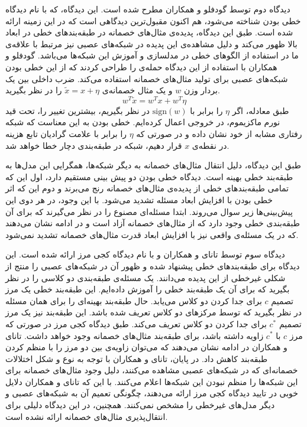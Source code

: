 \documentclass[12pt,onecolumn,a4paper]{article}
\begin{document}
دیدگاه دوم توسط گودفلو و همکاران\cite{goodfellow2014explaining}
مطرح شده است. این دیدگاه، که با نام دیدگاه خطی بودن شناخته می‌شود، هم اکنون مقبول‌ترین دیدگاهی است که در این زمینه ارائه شده است. طبق این دیدگاه، پدیده‌ی مثال‌های خصمانه در طبقه‌بندهای خطی در ابعاد بالا ظهور می‌کند و دلیل مشاهده‌ی این پدیده در شبکه‌های عصبی نیز مرتبط با علاقه‌ی ما در استفاده از الگوهای خطی در مدلسازی و آموزش این شبکه‌ها می‌باشد. گودفلو و همکاران با استفاده از این دیدگاه حمله‌ی
را طراحی کردند که از این خطی بودن شبکه‌های عصبی برای تولید مثال‌های خصمانه استفاده می‌کند. ضرب داخلی بین یک بردار وزن $w$ و یک مثال خصمانه‌ی $\tilde{x}=x+\eta$ را در نظر بگیرید.
\begin{equation*}
w^T\tilde{x}=w^Tx+w^T\eta
\end{equation*}
طبق معادله، اگر $\eta$ را برابر با $\mathrm{sign}(w)$ در نظر بگیریم، بیشترین تغییر را، تحت قید نورم ماکزیموم، در خروجی اعمال کرده‌ایم. خطی بودن به این معناست که شبکه رفتاری مشابه از خود نشان داده و در صورتی که $\eta$ را برابر با علامت گرادیان تابع هزینه در نقطه‌ی $x$ قرار دهیم، شبکه در طبقه‌بندی دچار خطا خواهد شد.

طبق این دیدگاه، دلیل انتقال مثال‌های خصمانه به دیگر شبکه‌ها، همگرایی این مدل‌ها به طبقه‌بند خطی بهینه است. دیدگاه خطی بودن دو پیش بینی مستقیم دارد، اول این که تمامی طبقه‌بندهای خطی از پدیده‌ی مثال‌های خصمانه رنج می‌برند و دوم این که اثر خطی بودن با افزایش ابعاد مسئله تشدید می‌شود. با این وجود، در
\cite{tanay2016boundary}
هر دوی این پیش‌بینی‌ها زیر سوال می‌روند. ابتدا مسئله‌ای  مصنوع را در نظر می‌گیرند که برای آن طبقه‌بندی خطی وجود دارد که از مثال‌های خصمانه آزاد است و در ادامه نشان می‌دهند که در یک مسئله‌ی واقعی نیز با افزایش ابعاد قدرت مثال‌های خصمانه تشدید نمی‌شود.

دیدگاه سوم توسط تانای و همکاران
\cite{tanay2016boundary}
 و با نام دیدگاه کجی مرز ارائه شده است. این دیدگاه برای طبقه‌بندهای خطی پیشنهاد شده و ظهور آن در شبکه‌های عصبی را منتج از شکلی غیرخطی از این پدیده می‌دانند. یک مسئله‌ی طبقه‌بندی دو کلاسی را در نظر بگیرید که برای آن یک طبقه‌بند خطی را آموزش داده‌ایم. این طبقه‌بند خطی یک مرز تصمیم
 $c$
 برای جدا کردن دو کلاس می‌یابد. حال طبقه‌بند بهینه‌ای را برای همان مسئله در نظر بگیرید که توسط مرکزهای دو کلاس تعریف شده باشد. این طبقه‌بند نیز یک مرز تصمیم
 $c^*$
 برای جدا کردن دو کلاس تعریف می‌کند. طبق دیدگاه کجی مرز در صورتی که مرز
 $c$
 با
 $c^*$
 زاویه داشته باشد، برای طبقه‌بند مثال‌های خصمانه وجود خواهد داشت. تانای و همکاران در ادامه نشان می‌دهند که می‌توان زاویه‌ی بین دو مرز را با منظم کردن
طبقه‌بند کاهش داد. در پایان، تانای و همکاران با توجه به نوع و شکل اختلالات خصمانه‌ای که در شبکه‌های عصبی مشاهده می‌کنند، دلیل وجود مثال‌های خصمانه برای این شبکه‌ها را منظم نبودن این شبکه‌ها اعلام می‌کنند. با این که تانای و همکاران دلایل خوبی در تایید دیدگاه کجی مرز ارائه می‌دهند، چگونگی تعمیم آن به شبکه‌های عصبی و دیگر مدل‌های غیرخطی را مشخص نمی‌کنند. همچنین، در این دیدگاه دلیلی برای انتقال‌پذیری مثال‌های خصمانه ارائه نشده است.
\end{document}
